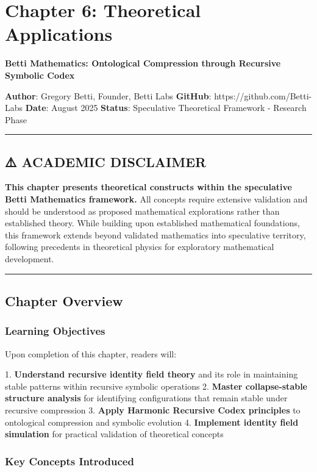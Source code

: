 \chapter{Chapter 6: Theoretical Applications}

\textbf{Betti Mathematics: Ontological Compression through Recursive Symbolic Codex}

\textbf{Author}: Gregory Betti, Founder, Betti Labs  
\textbf{GitHub}: https://github.com/Betti-Labs  
\textbf{Date}: August 2025  
\textbf{Status}: Speculative Theoretical Framework - Research Phase

\hrule

\section{⚠️ ACADEMIC DISCLAIMER}

\textbf{This chapter presents theoretical constructs within the speculative Betti Mathematics framework.} All concepts require extensive validation and should be understood as proposed mathematical explorations rather than established theory. While building upon established mathematical foundations, this framework extends beyond validated mathematics into speculative territory, following precedents in theoretical physics for exploratory mathematical development.

\hrule

\section{Chapter Overview}

\subsection{Learning Objectives}

Upon completion of this chapter, readers will:

1. \textbf{Understand recursive identity field theory} and its role in maintaining stable patterns within recursive symbolic operations
2. \textbf{Master collapse-stable structure analysis} for identifying configurations that remain stable under recursive compression
3. \textbf{Apply Harmonic Recursive Codex principles} to ontological compression and symbolic evolution
4. \textbf{Implement identity field simulation} for practical validation of theoretical concepts

\subsection{Key Concepts Introduced}

